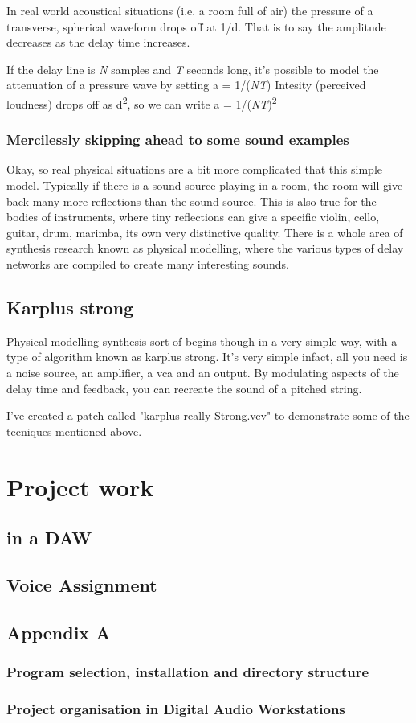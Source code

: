 \documentclass[11pt]{article}
\begin{document}
In real world acoustical situations (i.e. a room full of air) the
pressure of a transverse, spherical waveform drops off at 1/d. That is
to say the amplitude decreases as the delay time increases. 

If the delay line is \emph{N} samples and \emph{T} seconds long, it's possible
to model the attenuation of a pressure wave by setting a = 1/(\emph{NT})
Intesity (perceived loudness) drops off as d\textsuperscript{2}, so we can write 
a = 1/(\emph{NT})\textsuperscript{2}

\subsubsection{Mercilessly skipping ahead to some sound examples}
\label{sec:orgffe7e41}

Okay, so real physical situations are a bit more complicated that this
simple model. Typically if there is a sound source playing in a room,
the room will give back many more reflections than the sound
source. This is also true for the bodies of instruments, where tiny
reflections can give a specific violin, cello, guitar, drum, marimba,
its own very distinctive quality. There is a whole area of synthesis
research known as physical modelling, where the various types of delay
networks are compiled to create many interesting sounds. 

\subsection{Karplus strong}
\label{sec:org7dccc04}
Physical modelling synthesis sort of begins though in a very simple
way, with a type of algorithm known as karplus strong. It's very
simple infact, all you need is a noise source, an amplifier, a vca and
an output. By modulating aspects of the delay time and feedback, you
can recreate the sound of a pitched string.

I've created a patch called "karplus-really-Strong.vcv" to demonstrate
some of the tecniques mentioned above.

\section{Project work}
\label{sec:org13af9a6}
\subsection{in a DAW}
\label{sec:org544126a}
\subsection{Voice Assignment}
\label{sec:orgd828315}

\subsection{Appendix A}
\label{sec:org931e284}
\subsubsection{Program selection, installation and directory structure}
\label{sec:org18791f1}
\subsubsection{Project organisation in Digital Audio Workstations}
\label{sec:orgfc0af38}
\end{document}
